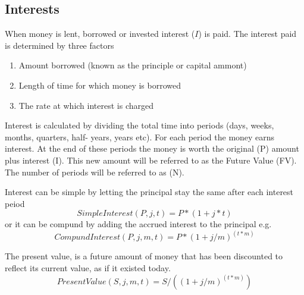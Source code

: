 \subsection{Interests}
When money is lent, borrowed or invested interest ($I$) is paid. The interest
paid is determined by three factors

\begin{enumerate}
    \item Amount borrowed (known as the principle or capital ammont)
    \item Length of time for which money is borrowed
    \item The rate at which interest is charged
\end{enumerate}

Interest is calculated by dividing the total time into periods (days, weeks,
months, quarters, half- years, years etc). For each period the money earns
interest. At the end of these periods the money is worth the original (P)
amount plus interest (I). This new amount will be referred to as the Future
Value (FV). The number of periods will be referred to as (N).

Interest can be simple by letting the principal stay the same after each
interest peiod
\[
    SimpleInterest(P,j,t) = P*(1+j*t)
\]
or it can be compund by adding the accrued interest to the principal e.g.
\[
    CompundInterest(P,j,m,t) = P*(1 + j/m)^(t*m)
\]

The present value, is a future amount of money that has been discounted to
reflect its current value, as if it existed today.
\[
    PresentValue(S,j,m,t) = S/((1 + j/m)^(t*m))
\]
